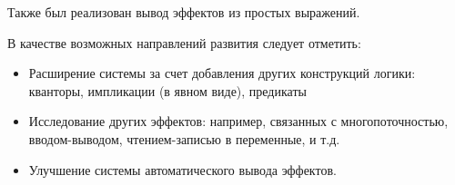 Также был реализован вывод эффектов из простых выражений.

В качестве возможных направлений развития следует отметить:

\begin{itemize}
	\item Расширение системы за счет добавления других конструкций логики: кванторы, импликации (в явном виде), предикаты
	
	\item Исследование других эффектов: например, связанных с многопоточностью, вводом-выводом, чтением-записью в переменные, и т.д.
	
	\item Улучшение системы автоматического вывода эффектов.
\end{itemize}